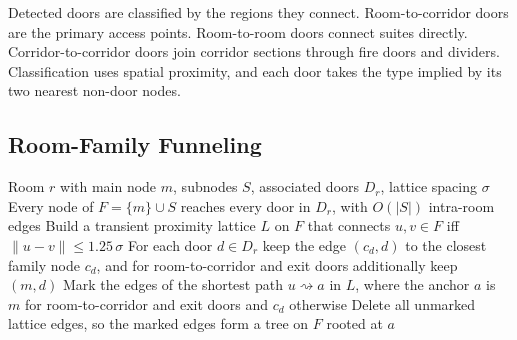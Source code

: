 \documentclass[manuscript,screen,review]{acmart}
\begin{document}
Detected doors are classified by the regions they connect. Room-to-corridor doors are the primary access points. Room-to-room doors connect suites directly. Corridor-to-corridor doors join corridor sections through fire doors and dividers.  Classification uses spatial proximity, and each door takes the type implied by its two nearest non-door nodes.

\subsection{Room-Family Funneling}
\label{subsec:funneling}


\begin{algorithm}[!htbp]
\caption{}
\label{alg:funneling}
\begin{algorithmic}[1]
\REQUIRE Room $r$ with main node $m$, subnodes $S$, associated doors $D_r$, lattice spacing $\sigma$
\ENSURE Every node of $F = \{m\} \cup S$ reaches every door in $D_r$, with $O(|S|)$ intra-room edges
\STATE Build a transient proximity lattice $L$ on $F$ that connects $u, v \in F$ iff $\|u - v\| \le 1.25\,\sigma$
\STATE For each door $d \in D_r$ keep the edge $(c_d, d)$ to the closest family node $c_d$, and for room-to-corridor and exit doors additionally keep $(m, d)$
    \STATE Mark the edges of the shortest path $u \rightsquigarrow a$ in $L$, where the anchor $a$ is $m$ for room-to-corridor and exit doors and $c_d$ otherwise
\ENDFOR
\STATE Delete all unmarked lattice edges, so the marked edges form a tree on $F$ rooted at $a$
\end{algorithmic}
\end{algorithm}

\begin{proposition}
\label{prop:funneling}
\end{proposition}
\end{document}

